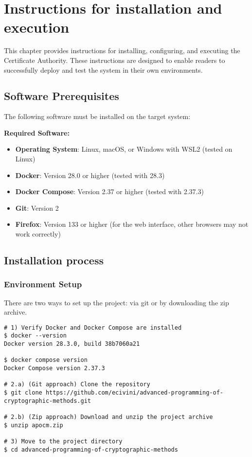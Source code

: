\chapter{Instructions for installation and execution}

This chapter provides instructions for installing, configuring, and executing the 
Certificate Authority. These instructions are designed to enable readers to successfully 
deploy and test the system in their own environments.

\section{Software Prerequisites}

The following software must be installed on the target system:

\textbf{Required Software:}
\begin{itemize}
    \item \textbf{Operating System}: Linux, macOS, or Windows with WSL2 (tested on Linux)
    \item \textbf{Docker}: Version 28.0 or higher (tested with 28.3)
    \item \textbf{Docker Compose}: Version 2.37 or higher (tested with 2.37.3)
    \item \textbf{Git}: Version 2
    \item \textbf{Firefox}: Version 133 or higher (for the web interface, other browsers may not work correctly)
\end{itemize}

\section{Installation process}

\subsection{Environment Setup}
There are two ways to set up the project: via git or by downloading the zip archive. 
\begin{verbatim}
# 1) Verify Docker and Docker Compose are installed
$ docker --version
Docker version 28.3.0, build 38b7060a21

$ docker compose version
Docker Compose version 2.37.3

# 2.a) (Git approach) Clone the repository 
$ git clone https://github.com/ecivini/advanced-programming-of-cryptographic-methods.git

# 2.b) (Zip approach) Download and unzip the project archive
$ unzip apocm.zip

# 3) Move to the project directory
$ cd advanced-programming-of-cryptographic-methods
\end{verbatim}


